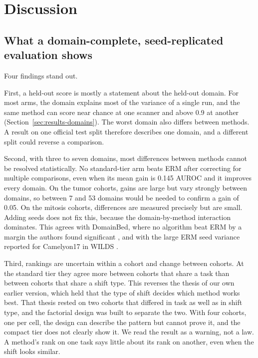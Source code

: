 \section{Discussion}
\label{sec:discussion}

\subsection{What a domain-complete, seed-replicated evaluation shows}
\label{sec:disc-summary}

Four findings stand out.

First, a held-out score is mostly a statement about the held-out domain. For
most arms, the domain explains most of the variance of a single run, and the
same method can score near chance at one scanner and above 0.9 at another
(Section~\ref{sec:results-domains}). The worst domain also differs between
methods. A result on one official test split therefore describes one domain,
and a different split could reverse a comparison.

Second, with three to seven domains, most differences between methods cannot
be resolved statistically. No standard-tier arm beats ERM after correcting for
multiple comparisons, even when its mean gain is 0.145 AUROC and it improves
every domain. On the tumor cohorts, gains are large but vary strongly between
domains, so between 7 and 53 domains would be needed to confirm a gain of 0.05. On the
mitosis cohorts, differences are measured precisely but are small. Adding seeds
does not fix this, because the domain-by-method interaction dominates. This
agrees with DomainBed, where no algorithm beat ERM by a margin the authors
found significant \citep{gulrajani2021domainbed}, and with the large ERM seed
variance reported for Camelyon17 in WILDS \citep{koh2021wilds}.

Third, rankings are uncertain within a cohort and change between cohorts. At
the standard tier they agree more between cohorts that share a task than
between cohorts that share a shift type. This reverses the thesis of our own
earlier version, which held that the type of shift decides which method works
best. That thesis rested on two cohorts that differed in task as well as in
shift type, and the factorial design was built to separate the two. With four
cohorts, one per cell, the design can describe the pattern but cannot prove it,
and the compact tier does not clearly show it. We read the result as a warning,
not a law. A method's rank on one task says little about its rank on another,
even when the shift looks similar.


